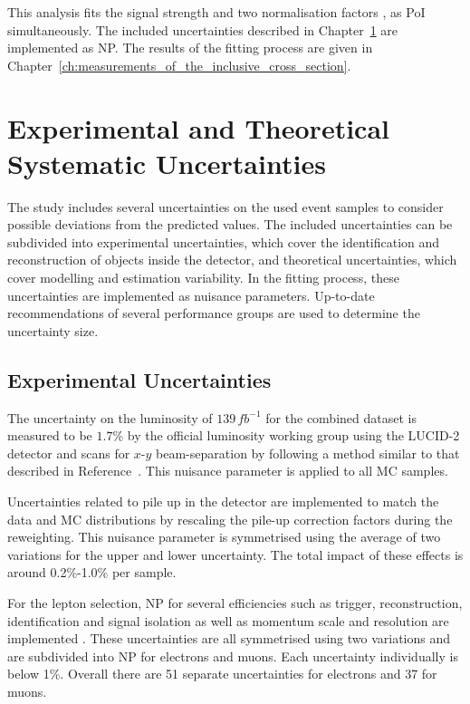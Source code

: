 \documentclass[bachelor,oneside, BCOR10mm,
			ngerman,english  %
]{GAUBM}
\begin{document}
This analysis fits the signal strength \muttZ and two normalisation factors \NttW, \NFakes as PoI simultaneously. The included uncertainties described in Chapter~\ref{ch:theoretical_and_experimental_systematic_uncertainties} are implemented as NP. The results of the fitting process are given in Chapter~\ref{ch:measurements_of_the_inclusive_cross_section}.


\chapter{Experimental and Theoretical Systematic Uncertainties}
\label{ch:theoretical_and_experimental_systematic_uncertainties}
The study includes several uncertainties on the used event samples to consider possible deviations from the predicted values. The included uncertainties can be subdivided into experimental uncertainties, which cover the identification and reconstruction of objects inside the detector, and theoretical uncertainties, which cover modelling and estimation variability. In the fitting process, these uncertainties are implemented as nuisance parameters. Up-to-date recommendations of several performance groups are used to determine the uncertainty size. 

\section{Experimental Uncertainties}
\label{sec:UncertaintiesExperimental}
The uncertainty on the luminosity of $139\,\unit{fb}^{-1}$ for the combined \runii dataset is measured to be $1.7\%$ by the official luminosity working group using the LUCID-2 detector \cite{uncertainty_luminosity02} and scans for $x$-$y$ beam-separation by following a method similar to that described in Reference~\cite{uncertainty_luminosity01}. This nuisance parameter is applied to all MC samples.  

Uncertainties related to pile up in the detector \cite{uncertainty_pileup} are implemented to match the data and MC distributions by rescaling the pile-up correction factors during the reweighting. This nuisance parameter is symmetrised using the average of two variations for the upper and lower uncertainty. The total impact of these effects is around 0.2\%-1.0\% per sample.

For the lepton selection, NP for several efficiencies such as trigger, reconstruction, identification and signal isolation as well as momentum scale and resolution are implemented \cite{uncertainty_lepton01, uncertainty_lepton02}. These uncertainties are all symmetrised using two variations and are subdivided into NP for electrons and muons. Each uncertainty individually is below 1\%. Overall there are 51 separate uncertainties for electrons and 37 for muons. 
\end{document}
